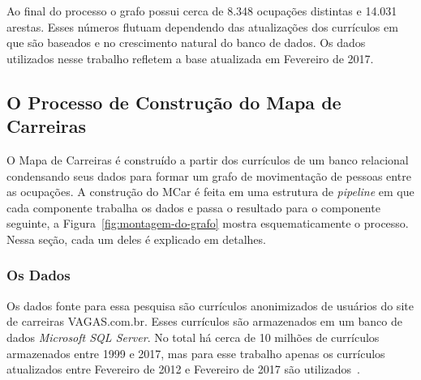 \documentclass[12pt,a4paper]{article}
\begin{document}
Ao final do processo o grafo possui cerca de 8.348 ocupações distintas e 14.031 arestas. Esses números flutuam dependendo das atualizações dos currículos em que são baseados e no crescimento natural do banco de dados. Os dados utilizados nesse trabalho refletem a base atualizada em Fevereiro de 2017.

\subsection{O Processo de Construção do Mapa de Carreiras} \label{sec:construcao}

O Mapa de Carreiras é construído a partir dos currículos de um banco relacional condensando seus dados para formar um grafo de movimentação de pessoas entre as ocupações. A construção do MCar é feita em uma estrutura de \textit{pipeline} em que cada componente trabalha os dados e passa o resultado para o componente seguinte, a Figura~\ref{fig:montagem-do-grafo} mostra esquematicamente o processo. Nessa seção, cada um deles é explicado em detalhes.


\subsubsection{Os Dados}

Os dados fonte para essa pesquisa são currículos anonimizados de usuários do site de carreiras VAGAS.com.br. Esses currículos são armazenados em um banco de dados \textit{Microsoft SQL Server}. No total há cerca de 10 milhões de currículos~ armazenados entre 1999 e 2017, mas para esse trabalho apenas os currículos atualizados entre Fevereiro de 2012 e Fevereiro de 2017 são utilizados~.

\end{document}
